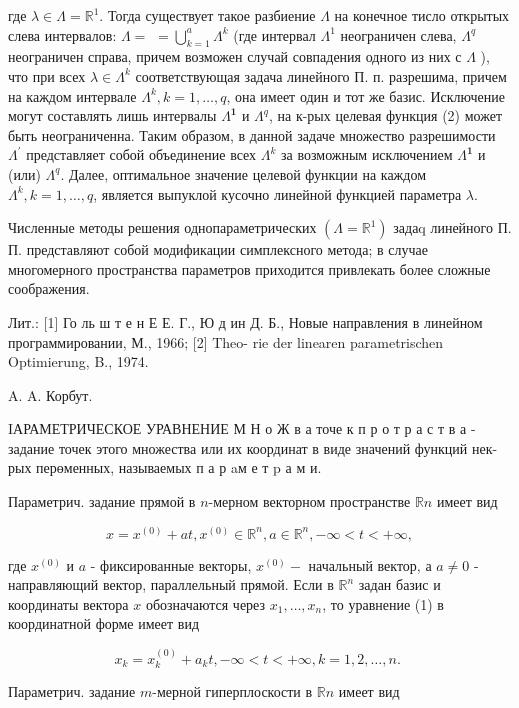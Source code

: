 \documentclass[10pt]{article}
\begin{document}
где $\lambda \in \Lambda=\mathbb{R}^{1}$. Тогда существует такое разбиение $\Lambda$ на конечное тисло открытых слева интервалов: $\Lambda=$ $=\bigcup_{k=1}^{a} \Lambda^{k}$ (где интервал $\Lambda^{1}$ неограничен слева, $\Lambda^{q}$ неограничен справа, причем возможен случай совпадения одного из них с $\Lambda$ ), что при всех $\lambda \in \Lambda^{k}$ соответствующая задача линейного П. п. разрешима, причем на каждом интервале $\Lambda^{k}, k=1, \ldots, q$, она имеет один и тот же базис. Исключение могут составлять лишь интервалы $\Lambda^{\mathbf{1}}$ и $\Lambda^{q}$, на к-рых целевая функция (2) может быть неограниченна. Таким образом, в данной задаче множество разрешимости $\Lambda^{\prime}$ представляет собой объединение всех $\Lambda^{k}$ за возможным исключением $\Lambda^{\mathbf{1}}$ и (или) $\Lambda^{q}$. Далее, оптимальное значение целевой функции на каждом $\Lambda^{k}, k=1, \ldots, q$, является выпуклой кусочно линейной функцией параметра $\lambda$.

Численные методы решения однопараметрических $\left(\Lambda=\mathbb{R}^{1}\right)$ задаq линейного П. П. представляют собой модификации симплексного метода; в случае многомерного пространства параметров приходится привлекать более сложные соображения.

Лит.: [1] Го ль ш т е н Е Е. Г., Ю д ин Д. Б., Новые направления в линейном программировании, М., 1966; [2] Theo-
rie der linearen parametrischen Optimierung, B., 1974.

A. A. Корбут.

IАРАМЕТРИЧЕСКОЕ УРАВНЕНИЕ М Н о Ж в а точе к п р о т р а с т в а - задание точек этого множества или их координат в виде значений функций нек-рых перөменных, называемых п а р aм е т p а м и.

Параметрич. задание прямой в $n$-мерном векторном пространстве $\mathbb{R} n$ имеет вид

\[
x=x^{(0)}+a t, x^{(0)} \in \mathbb{R}^{n}, a \in \mathbb{R}^{n},-\infty<t<+\infty,
\]

где $x^{(0)}$ и $a$ - фиксированные векторы, $x^{(0)}-$ начальный вектор, а $a \neq 0$ - направляющий вектор, параллельный прямой. Если в $\mathbb{R}^{n}$ задан базис и координаты вектора $x$ обозначаются через $x_{1}, \ldots, x_{n}$, то уравнение (1) в координатной форме имеет вид

\[
x_{k}=x_{k}^{(0)}+a_{k} t,-\infty<t<+\infty, k=1,2, \ldots, n \text {. }
\]

Параметрич. задание $m$-мерной гиперплоскости в $\mathbb{R} n$ имеет вид
\end{document}
